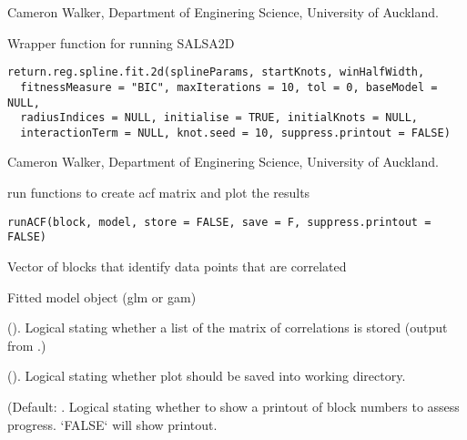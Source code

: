 \documentclass[a4paper]{book}
\begin{document}
%
\begin{Author}\relax
Cameron Walker, Department of Enginering Science, University of Auckland.
\end{Author}
%
\begin{Description}\relax
Wrapper function for running SALSA2D
\end{Description}
%
\begin{Usage}
\begin{verbatim}
return.reg.spline.fit.2d(splineParams, startKnots, winHalfWidth,
  fitnessMeasure = "BIC", maxIterations = 10, tol = 0, baseModel = NULL,
  radiusIndices = NULL, initialise = TRUE, initialKnots = NULL,
  interactionTerm = NULL, knot.seed = 10, suppress.printout = FALSE)
\end{verbatim}
\end{Usage}
%
\begin{Author}\relax
Cameron Walker, Department of Enginering Science, University of Auckland.
\end{Author}
%
\begin{Description}\relax
run functions to create acf matrix and plot the results
\end{Description}
%
\begin{Usage}
\begin{verbatim}
runACF(block, model, store = FALSE, save = F, suppress.printout = FALSE)
\end{verbatim}
\end{Usage}
%
\begin{Arguments}
\begin{ldescription}
\item[\code{block}] Vector of blocks that identify data points that are correlated

\item[\code{model}] Fitted model object (glm or gam)

\item[\code{store}] (). Logical stating whether a list of the matrix of correlations is stored (output from .)

\item[\code{save}] (). Logical stating whether plot should be saved into working directory.

\item[\code{suppress.printout}] (Default: . Logical stating whether to show a printout of block numbers to assess progress. `FALSE` will show printout.
\end{ldescription}
\end{Arguments}
\end{document}
